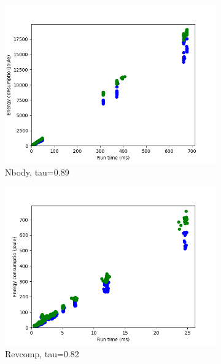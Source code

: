 \begin{figure}[h]
\begin{subfigure}[b]{0.45\textwidth}
        \includegraphics[width=\textwidth]{graphs/time-problem4.png}
        \caption{Nbody, tau=0.89}
        \label{fig:time4}
    \end{subfigure}
    \begin{subfigure}[b]{0.45\textwidth}
        \centering
        \includegraphics[width=\textwidth]{graphs/time-problem5.png}
        \caption{Revcomp, tau=0.82}
        \label{fig:time5}
    \end{subfigure}
    \begin{subfigure}[b]{0.45\textwidth}
        \centering

\end{subfigure}
\end{figure}
